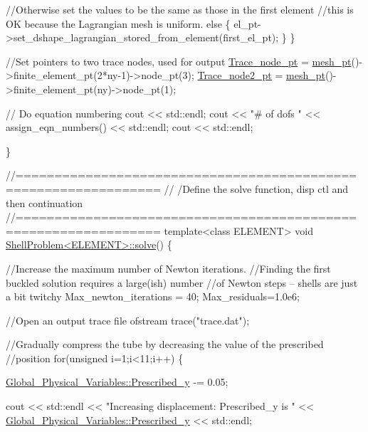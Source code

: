 \begin{DoxyCodeInclude}
   \textcolor{comment}{//Otherwise set the values to be the same as those in the first element}
   \textcolor{comment}{//this is OK because the Lagrangian mesh is uniform.}
   \textcolor{keywordflow}{else}
    \{
     el\_pt->set\_dshape\_lagrangian\_stored\_from\_element(first\_el\_pt);
    \}
  \}

 \textcolor{comment}{//Set pointers to two trace nodes, used for output}
 \hyperlink{classShellProblem_a45230216c4791c683218ff6d7f4ba9a0}{Trace\_node\_pt} = \hyperlink{classShellProblem_a1905a1b913469ed54f7c8f55d133ff57}{mesh\_pt}()->finite\_element\_pt(2*ny-1)->node\_pt(3);
 \hyperlink{classShellProblem_a1933abc1b3e5637e23fa2809eb1cd88f}{Trace\_node2\_pt} = \hyperlink{classShellProblem_a1905a1b913469ed54f7c8f55d133ff57}{mesh\_pt}()->finite\_element\_pt(ny)->node\_pt(1);

 \textcolor{comment}{// Do equation numbering}
 cout << std::endl;
 cout << \textcolor{stringliteral}{"# of dofs "} << assign\_eqn\_numbers() << std::endl;
 cout << std::endl;

\}


\textcolor{comment}{//================================================================}
\textcolor{comment}{// /Define the solve function, disp ctl and then continuation}
\textcolor{comment}{//================================================================}
\textcolor{keyword}{template}<\textcolor{keyword}{class} ELEMENT>
\textcolor{keywordtype}{void} \hyperlink{classShellProblem_aa6d150bd1c137edbf4ded27ed044766d}{ShellProblem<ELEMENT>::solve}()
\{

 \textcolor{comment}{//Increase the maximum number of Newton iterations.}
 \textcolor{comment}{//Finding the first buckled solution requires a large(ish) number}
 \textcolor{comment}{//of Newton steps -- shells are just a bit twitchy}
 Max\_newton\_iterations = 40;
 Max\_residuals=1.0e6;

 
 \textcolor{comment}{//Open an output trace file}
 ofstream trace(\textcolor{stringliteral}{"trace.dat"});


 \textcolor{comment}{//Gradually compress the tube by decreasing the value of the prescribed}
 \textcolor{comment}{//position }
 \textcolor{keywordflow}{for}(\textcolor{keywordtype}{unsigned} i=1;i<11;i++)
  \{

   \hyperlink{namespaceGlobal__Physical__Variables_aa2f7ea98cb8462b3920a026bed5f6099}{Global\_Physical\_Variables::Prescribed\_y} -= 0.05;

   cout << std::endl << \textcolor{stringliteral}{"Increasing displacement: Prescribed\_y is "} 
        << \hyperlink{namespaceGlobal__Physical__Variables_aa2f7ea98cb8462b3920a026bed5f6099}{Global\_Physical\_Variables::Prescribed\_y} << std::endl;


\end{DoxyCodeInclude}
